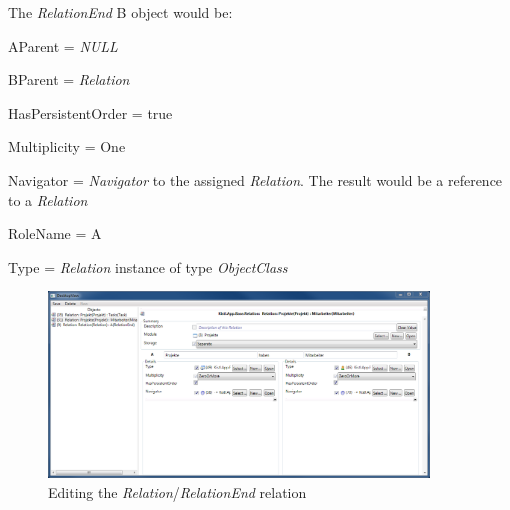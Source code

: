 The \emph{RelationEnd} B object would be:
\begin{descriptionBorder}
	\item[AParent] { =  \emph{NULL} }
	\item[BParent] { = \emph{Relation} }
	\item[HasPersistentOrder] { = true  }
	\item[Multiplicity] { = One }
	\item[Navigator] { = \emph{Navigator} to the assigned \emph{Relation}. The result would be a reference to a \emph{Relation}  }
	\item[RoleName] { = A }
	\item[Type] { = \emph{Relation} instance of type \emph{ObjectClass} }
\end{descriptionBorder}

\begin{figure}[ht]
	\begin{center}
		\includegraphics[width=0.9\textwidth]{images/ScreenShot_Rel_Project_ProjectMember.png}
		\caption{Editing the \emph{Relation}/\emph{RelationEnd} relation}
		\label{editing_relation_relationend_relation}
	\end{center}
\end{figure}